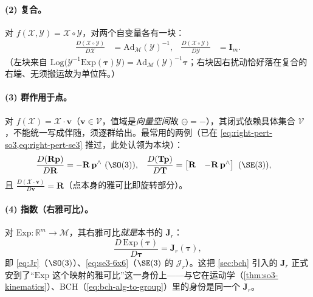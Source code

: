 \paragraph{(2) 复合。}对 $f(\mathcal{X},\mathcal{Y})=\mathcal{X}\circ\mathcal{Y}$，对两个自变量各有一块：
\begin{align}
  \frac{D(\mathcal{X}\circ\mathcal{Y})}{D\mathcal{X}}&=\mathrm{Ad}_{\mathcal{M}}(\mathcal{Y})^{-1},
  &\frac{D(\mathcal{X}\circ\mathcal{Y})}{D\mathcal{Y}}&=\mathbf{I}_m.
  \label{eq:jac-comp-block}
\end{align}
（左块来自 $\mathrm{Log}\big(\mathcal{Y}^{-1}\mathrm{Exp}(\boldsymbol{\tau})\mathcal{Y}\big)=\mathrm{Ad}_{\mathcal{M}}(\mathcal{Y})^{-1}\boldsymbol{\tau}$；右块因右扰动恰好落在复合的右端、无须搬运故为单位阵。）

\paragraph{(3) 群作用于点。}对 $f(\mathcal{X})=\mathcal{X}\cdot\mathbf{v}$（$\mathbf{v}\in\mathcal{V}$，值域是\emph{向量空间}故 $\ominus=-$），其闭式依赖具体集合 $\mathcal{V}$，不能统一写成伴随，须逐群给出。最常用的两例（已在 \cref{eq:right-pert-so3,eq:right-pert-se3} 推过，此处认领为本块）：
\begin{align}
  \frac{D(\mathbf{R}\mathbf{p})}{D\mathbf{R}}&=-\mathbf{R}\,\mathbf{p}^\wedge\ (\SO(3)),
  &\frac{D(\mathbf{T}\mathbf{p})}{D\mathbf{T}}&=\begin{bmatrix}\mathbf{R}&-\mathbf{R}\,\mathbf{p}^\wedge\end{bmatrix}\ (\SE(3)),
  \label{eq:jac-action-block}
\end{align}
且 $\frac{D(\mathcal{X}\cdot\mathbf{v})}{D\mathbf{v}}=\mathbf{R}$（点本身的雅可比即旋转部分）。

\paragraph{(4) 指数（右雅可比）。}对 $\mathrm{Exp}:\mathbb{R}^m\to\mathcal{M}$，其右雅可比\emph{就是}本书的 $\mathbf{J}_r$：
\begin{equation}
  \frac{D\,\mathrm{Exp}(\boldsymbol{\tau})}{D\boldsymbol{\tau}}=\mathbf{J}_r(\boldsymbol{\tau}),
  \label{eq:jac-exp-block}
\end{equation}
即 \cref{eq:Jr}（$\SO(3)$）、\cref{eq:se3-6x6}（$\SE(3)$ 的 $\boldsymbol{\mathcal{J}}_r$）。这把 \cref{sec:bch} 引入的 $\mathbf{J}_r$ 正式安到了“$\mathrm{Exp}$ 这个映射的雅可比”这一身份上——与它在运动学（\cref{thm:so3-kinematics}）、BCH（\cref{eq:bch-alg-to-group}）里的身份是同一个 $\mathbf{J}_r$。


